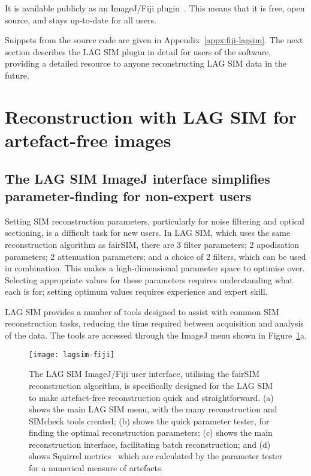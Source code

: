 It is available publicly as an ImageJ/Fiji plugin~\cite{lagsim}.
This means that it is free, open source, and stays up-to-date for all users.

Snippets from the source code are given in Appendix~\ref{appx:fiji-lagsim}. The next section describes the LAG SIM plugin in detail for users of the software, providing a detailed resource to anyone reconstructing LAG SIM data in the future.


\section{Reconstruction with LAG SIM for artefact-free images} \label{sec:lagsimFiji}

\subsection{The LAG SIM ImageJ interface simplifies parameter-finding for non-expert users}

Setting SIM reconstruction parameters, particularly for noise filtering and optical sectioning, is a difficult task for new users.
In LAG SIM, which uses the same reconstruction algorithm as fairSIM, there are 3 filter parameters; 2 apodisation parameters; 2 attenuation parameters; and a choice of 2 filters, which can be used in combination.
This makes a high-dimensional parameter space to optimise over.
Selecting appropriate values for these parameters requires understanding what each is for; setting optimum values requires experience and expert skill.

LAG SIM provides a number of tools designed to assist with common SIM reconstruction tasks, reducing the time required between acquisition and analysis of the data.
The tools are accessed through the ImageJ menu shown in Figure~\ref{fig:lagsim-fiji-interface}a.

\begin{figure}[ph!]
	\centering
		\texttt{[image: lagsim-fiji]}
	\caption[LAG SIM: A Fiji interface makes artefact-free reconstruction quick and simple for non-expert users]{The LAG SIM ImageJ/Fiji user interface, utilising the fairSIM reconstruction algorithm, is specifically designed for the LAG SIM to make artefact-free reconstruction quick and straightforward. (a) shows the main LAG SIM menu, with the many reconstruction and SIMcheck tools created; (b) shows the quick parameter tester, for finding the optimal reconstruction parameters; (c) shows the main reconstruction interface, facilitating batch reconstruction; and (d) shows Squirrel metrics~\cite{culley2018quantitative} which are calculated by the parameter tester for a numerical measure of artefacts. }
\label{fig:lagsim-fiji-interface}
\end{figure}

